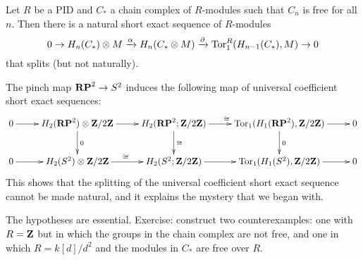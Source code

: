 \begin{theorem}
Let $R$ be a PID and $C_\ast$ a chain complex of $R$-modules such that $C_n$ 
is free for all $n$. Then there is a natural short 
exact sequence of $R$-modules
\begin{equation*}
0\to H_n(C_\ast)\otimes M\xrightarrow{\alpha} H_n(C_\ast\otimes M)\xrightarrow{\partial}\operatorname{Tor}^R_1( H_{n-1}(C_\ast),M)\to 0
\end{equation*}
that splits (but not naturally).
\end{theorem}
\begin{example}
The pinch map $\mathbf{RP}^2\to S^2$ induces the following map of universal
coefficient short exact sequences:
\[
\xymatrix{
0 \ar[r] & H_2(\RP^2)\otimes\Z/2\Z \ar[d]^0 \ar[r] & 
H_2(\RP^2;\Z/2\Z) \ar[d]^\cong \ar[r]^\cong & 
\Tor_1(H_1(\RP^2),\Z/2\Z) \ar[d]^0 \ar[r] & 0 \\
0 \ar[r] & H_2(S^2)\otimes\Z/2\Z \ar[r]^\cong & H_2(S^2;\Z/2\Z) \ar[r] &
\Tor_1(H_1(S^2),\Z/2\Z) \ar[r] & 0 
}\]
This shows that the splitting of the universal coefficient short exact 
sequence cannot be made natural, and it explains the mystery that we began 
with.
\end{example}
\begin{remark}
The hypotheses are essential. Exercise: construct two counterexamples:
one with $R=\mathbf Z$ but in which the groups in the chain complex are not free,
and one in which $R=k[d]/d^2$ and the modules in $C_*$ are free over $R$.  
\end{remark}

